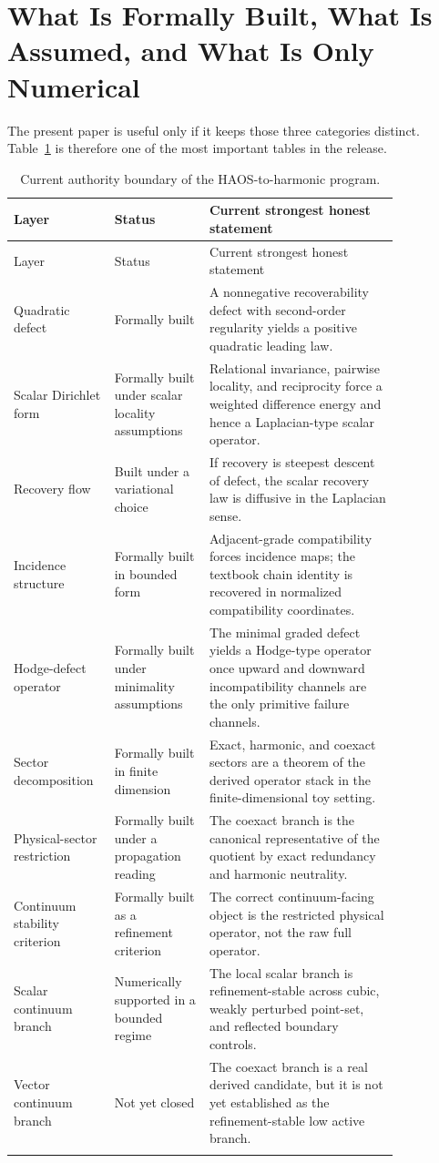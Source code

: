 \documentclass[11pt]{article}
\begin{document}
\section{What Is Formally Built, What Is Assumed, and What Is Only Numerical}

The present paper is useful only if it keeps those three categories distinct. Table~\ref{tab:boundary} is therefore one of the most important tables in the release.

\begin{longtable}{p{0.18\linewidth}p{0.22\linewidth}p{0.44\linewidth}}
\caption{Current authority boundary of the HAOS-to-harmonic program.}\\
\toprule
Layer & Status & Current strongest honest statement \\
\midrule
\endfirsthead
\toprule
Layer & Status & Current strongest honest statement \\
\midrule
\endhead
Quadratic defect & Formally built & A nonnegative recoverability defect with second-order regularity yields a positive quadratic leading law. \\
Scalar Dirichlet form & Formally built under scalar locality assumptions & Relational invariance, pairwise locality, and reciprocity force a weighted difference energy and hence a Laplacian-type scalar operator. \\
Recovery flow & Built under a variational choice & If recovery is steepest descent of defect, the scalar recovery law is diffusive in the Laplacian sense. \\
Incidence structure & Formally built in bounded form & Adjacent-grade compatibility forces incidence maps; the textbook chain identity is recovered in normalized compatibility coordinates. \\
Hodge-defect operator & Formally built under minimality assumptions & The minimal graded defect yields a Hodge-type operator once upward and downward incompatibility channels are the only primitive failure channels. \\
Sector decomposition & Formally built in finite dimension & Exact, harmonic, and coexact sectors are a theorem of the derived operator stack in the finite-dimensional toy setting. \\
Physical-sector restriction & Formally built under a propagation reading & The coexact branch is the canonical representative of the quotient by exact redundancy and harmonic neutrality. \\
Continuum stability criterion & Formally built as a refinement criterion & The correct continuum-facing object is the restricted physical operator, not the raw full operator. \\
Scalar continuum branch & Numerically supported in a bounded regime & The local scalar branch is refinement-stable across cubic, weakly perturbed point-set, and reflected boundary controls. \\
Vector continuum branch & Not yet closed & The coexact branch is a real derived candidate, but it is not yet established as the refinement-stable low active branch. \\
\bottomrule
\label{tab:boundary}
\end{longtable}
\end{document}
